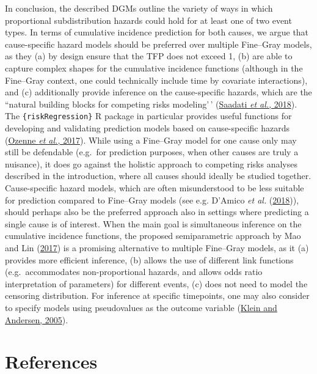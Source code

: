 \documentclass[
  letterpaper,
  DIV=11,
  numbers=noendperiod]{scrreprt}
\begin{document}
In conclusion, the described DGMs outline the variety of ways in which
proportional subdistribution hazards could hold for at least one of two
event types. In terms of cumulative incidence prediction for both
causes, we argue that cause-specific hazard models should be preferred
over multiple Fine--Gray models, as they (a) by design ensure that the
TFP does not exceed 1, (b) are able to capture complex shapes for the
cumulative incidence functions (although in the Fine--Gray context, one
could technically include time by covariate interactions), and (c)
additionally provide inference on the cause-specific hazards, which are
the ``natural building blocks for competing risks modeling'\,'
(\protect\hyperlink{ref-saadatiPredictionAccuracyVariable2018}{Saadati
\emph{et al.}, 2018}). The \texttt{\{riskRegression\}} R package in
particular provides useful functions for developing and validating
prediction models based on cause-specific hazards
(\protect\hyperlink{ref-RJ-2017-062}{Ozenne \emph{et al.}, 2017}). While
using a Fine--Gray model for one cause only may still be defendable
(e.g.~for prediction purposes, when other causes are truly a nuisance),
it does go against the holistic approach to competing risks analyses
described in the introduction, where all causes should ideally be
studied together. Cause-specific hazard models, which are often
misunderstood to be less suitable for prediction compared to Fine--Gray
models (see e.g. D'Amico \emph{et al.}
(\protect\hyperlink{ref-damicoClinicalStatesCirrhosis2018}{2018})),
should perhaps also be the preferred approach also in settings where
predicting a single cause is of interest. When the main goal is
simultaneous inference on the cumulative incidence functions, the
proposed semiparametric approach by Mao and Lin
(\protect\hyperlink{ref-maoEfficientEstimationSemiparametric2017}{2017})
is a promising alternative to multiple Fine--Gray models, as it (a)
provides more efficient inference, (b) allows the use of different link
functions (e.g.~accommodates non-proportional hazards, and allows odds
ratio interpretation of parameters) for different events, (c) does not
need to model the censoring distribution. For inference at specific
timepoints, one may also consider to specify models using pseudovalues
as the outcome variable
(\protect\hyperlink{ref-kleinRegressionModelingCompeting2005a}{Klein and
Andersen, 2005}).

\hypertarget{references-3}{%
\section*{References}\label{references-3}}
\end{document}

